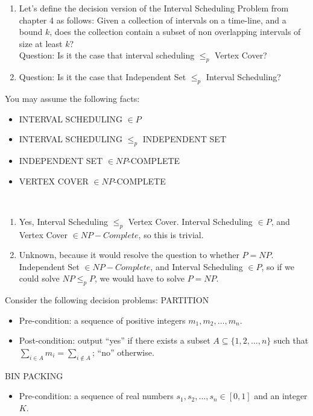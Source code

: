\documentclass{assignment}
\begin{document}
\begin{problemlist}
\begin{problem}
\begin{enumerate}
\item Let's define the decision version of the Interval Scheduling Problem from chapter 4 as follows: Given a collection of intervals on a time-line, and a bound $k$, does the collection contain a subset of non overlapping intervals of size at least $k$?\\
Question: Is it the case that interval scheduling $\le_p$ Vertex Cover?
\item Question: Is it the case that Independent Set $\le_p$ Interval Scheduling?
\end{enumerate}
You may assume the following facts:
\begin{itemize}
\item INTERVAL SCHEDULING $\in P$
\item INTERVAL SCHEDULING $\le_p$ INDEPENDENT SET
\item INDEPENDENT SET $\in NP$-COMPLETE
\item VERTEX COVER $\in NP$-COMPLETE
\end{itemize}
\end{problem}
\begin{answer}
\\
\begin{enumerate}
\item Yes, Interval Scheduling $\le_p$ Vertex Cover. Interval Scheduling $\in P$, and Vertex Cover $\in NP-Complete$, so this is trivial.
\item Unknown, because it would resolve the question to whether $P=NP$. Independent Set $\in NP-Complete$, and Interval Scheduling $\in P$, so if we could solve $NP \le_p P$, we would have to solve $P=NP$.
\end{enumerate}
\end{answer}
\clearpage
\pbitem
\begin{problem}
Consider the following decision problems:
PARTITION
\begin{itemize}
\item Pre-condition: a sequence of positive integers $m_1,m_2,\ldots,m_n$.
\item Post-condition: output ``yes'' if there exists a subset $A\subseteq \{1,2,\ldots,n\}$ such that $\sum_{i\in A}m_i = \sum_{i\notin A}$; ``no'' otherwise.
\end{itemize}
BIN PACKING
\begin{itemize}
\item Pre-condition: a sequence of real numbers $s_1,s_2,\ldots,s_n \in [0,1]$ and an integer $K$.

\end{itemize}
\end{problem}
\end{problemlist}
\end{document}
